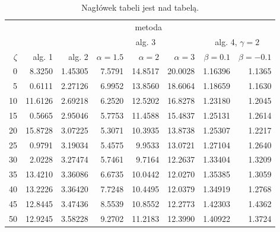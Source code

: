 \documentclass[a4paper,twoside,12pt]{book}
\begin{document}
\begin{table}
\centering
\caption{Nagłówek tabeli jest nad tabelą.}
\label{id:tab:wyniki}
\begin{tabular}{rrrrrrrr}
\toprule
	         &                                     \multicolumn{7}{c}{metoda}                                      \\
	         \cmidrule{2-8}
	         &         &         &        \multicolumn{3}{c}{alg. 3}        & \multicolumn{2}{c}{alg. 4, $\gamma = 2$} \\
	         \cmidrule(r){4-6}\cmidrule(r){7-8}
	$\zeta$ &     alg. 1 &   alg. 2 & $\alpha= 1.5$ & $\alpha= 2$ & $\alpha= 3$ &   $\beta = 0.1$  &   $\beta = -0.1$ \\
\midrule
	       0 &  8.3250 & 1.45305 &       7.5791 &    14.8517 &    20.0028 & 1.16396 &                       1.1365 \\
	       5 &  0.6111 & 2.27126 &       6.9952 &    13.8560 &    18.6064 & 1.18659 &                       1.1630 \\
	      10 & 11.6126 & 2.69218 &       6.2520 &    12.5202 &    16.8278 & 1.23180 &                       1.2045 \\
	      15 &  0.5665 & 2.95046 &       5.7753 &    11.4588 &    15.4837 & 1.25131 &                       1.2614 \\
	      20 & 15.8728 & 3.07225 &       5.3071 &    10.3935 &    13.8738 & 1.25307 &                       1.2217 \\
	      25 &  0.9791 & 3.19034 &       5.4575 &     9.9533 &    13.0721 & 1.27104 &                       1.2640 \\
	      30 &  2.0228 & 3.27474 &       5.7461 &     9.7164 &    12.2637 & 1.33404 &                       1.3209 \\
	      35 & 13.4210 & 3.36086 &       6.6735 &    10.0442 &    12.0270 & 1.35385 &                       1.3059 \\
	      40 & 13.2226 & 3.36420 &       7.7248 &    10.4495 &    12.0379 & 1.34919 &                       1.2768 \\
	      45 & 12.8445 & 3.47436 &       8.5539 &    10.8552 &    12.2773 & 1.42303 &                       1.4362 \\
	      50 & 12.9245 & 3.58228 &       9.2702 &    11.2183 &    12.3990 & 1.40922 &                       1.3724 \\
\bottomrule
\end{tabular}
\end{table}  
\end{document}
